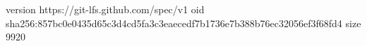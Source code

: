 version https://git-lfs.github.com/spec/v1
oid sha256:857bc0e0435d65c3d4cd5fa3c3eaecedf7b1736e7b388b76ec32056ef3f68fd4
size 9920
